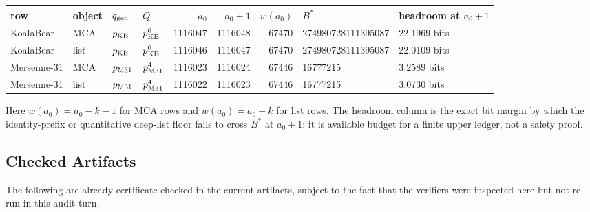 \begin{center}\footnotesize
\begin{tabular}{@{}llllrrrll@{}}
\toprule
row & object & \(q_{\rm gen}\) & \(Q\) & \(a_0\) & \(a_0+1\) & \(w(a_0)\) &
\(B^*\) & headroom at \(a_0+1\)\\
\midrule
KoalaBear & MCA & \(p_{\rm KB}\) & \(p_{\rm KB}^6\) &
1116047 & 1116048 & 67470 &
274980728111395087 & 22.1969 bits\\
KoalaBear & list & \(p_{\rm KB}\) & \(p_{\rm KB}^6\) &
1116046 & 1116047 & 67470 &
274980728111395087 & 22.0109 bits\\
Mersenne-31 & MCA & \(p_{\rm M31}\) & \(p_{\rm M31}^4\) &
1116023 & 1116024 & 67446 &
16777215 & 3.2589 bits\\
Mersenne-31 & list & \(p_{\rm M31}\) & \(p_{\rm M31}^4\) &
1116022 & 1116023 & 67446 &
16777215 & 3.0730 bits\\
\bottomrule
\end{tabular}
\end{center}

Here \(w(a_0)=a_0-k-1\) for MCA rows and \(w(a_0)=a_0-k\) for list rows.
The headroom column is the exact bit margin by which the identity-prefix or
quantitative deep-list floor fails to cross \(B^*\) at \(a_0+1\); it is
available budget for a finite upper ledger, not a safety proof.

\subsection{Checked Artifacts}

The following are already certificate-checked in the current artifacts, subject
to the fact that the verifiers were inspected here but not re-run in this audit
turn.

